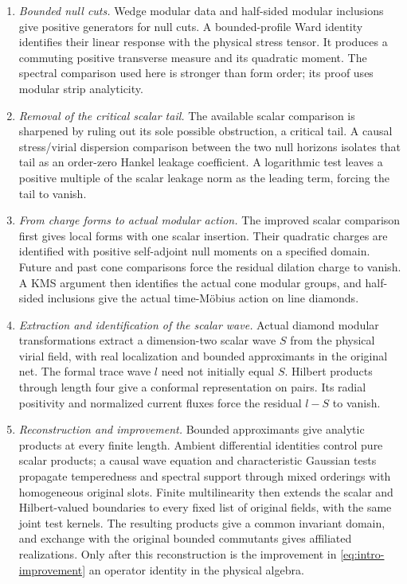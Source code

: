 \begin{enumerate}
\item \emph{Bounded null cuts.} Wedge modular data and half-sided modular inclusions give positive generators for null cuts. A bounded-profile Ward identity identifies their linear response with the physical stress tensor. It produces a commuting positive transverse measure and its quadratic moment. The spectral comparison used here is stronger than form order; its proof uses modular strip analyticity.
\item \emph{Removal of the critical scalar tail.} The available scalar comparison is sharpened by ruling out its sole possible obstruction, a critical tail. A causal stress/virial dispersion comparison between the two null horizons isolates that tail as an order-zero Hankel leakage coefficient. A logarithmic test leaves a positive multiple of the scalar leakage norm as the leading term, forcing the tail to vanish.
\item \emph{From charge forms to actual modular action.} The improved
scalar comparison first gives local forms with one scalar insertion.
Their quadratic charges are identified with positive self-adjoint null
moments on a specified domain. Future and past cone comparisons force
the residual dilation charge to vanish. A KMS argument then identifies
the actual cone modular groups, and half-sided inclusions give the
actual time-M\"obius action on line diamonds.
\item \emph{Extraction and identification of the scalar wave.} Actual
diamond modular transformations extract a dimension-two scalar wave
$S$ from the physical virial field, with real localization and bounded
approximants in the original net. The formal trace wave $l$ need not
initially equal $S$. Hilbert products through length four give a
conformal representation on pairs. Its radial positivity and normalized
current fluxes force the residual $l-S$ to vanish.
\item \emph{Reconstruction and improvement.} Bounded approximants give
analytic products at every finite length. Ambient differential identities
control pure scalar products; a causal wave equation and characteristic
Gaussian tests propagate temperedness and spectral support through mixed
orderings with homogeneous original slots. Finite multilinearity then
extends the scalar and Hilbert-valued boundaries to every fixed list of
original fields, with the same joint test kernels. The resulting products
give a common invariant domain, and exchange with the original bounded
commutants gives affiliated realizations. Only after this reconstruction
is the improvement in \eqref{eq:intro-improvement} an operator identity in
the physical algebra.
\end{enumerate}

